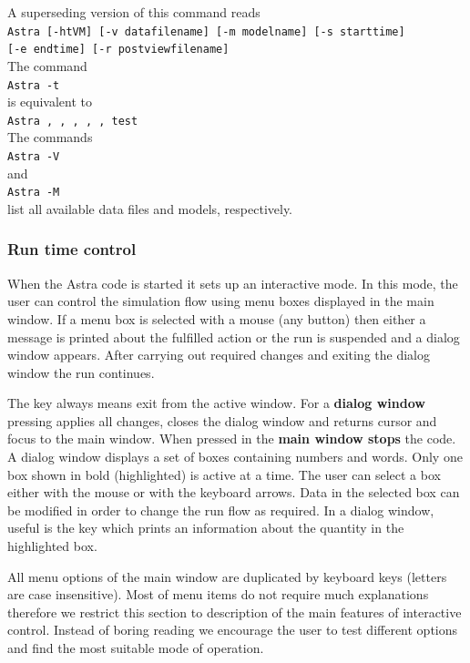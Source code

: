A superseding version of this command reads
\\{\indent
\tt Astra [-htVM] [-v data\us file\us name] [-m model\us name]
[-s start\us time] \\
\hspace*{4.9em}
[-e end\us time] [-r post\us view\us file\us name]
}\\
The command 
\\{\indent
\tt Astra -t
}\\
is equivalent to
\\{\indent
\tt Astra~,~,~,~,~,~test
}\\
The commands
\\{\indent
\tt Astra -V
}\\
and
\\{\indent
\tt Astra -M
}\\
list all available data files and models, respectively.

\subsubsection{Run time control}

When the Astra code is started it sets up an interactive mode.
In this mode, the user can control the simulation flow using menu boxes
displayed in the main window. 
If a menu box is selected with a mouse (any button) then either a
message is printed about the fulfilled action or the run is
suspended and a dialog window appears.
After carrying out required changes and exiting the dialog window the
run continues. 

The key  always means exit from the active window. 
For a {\bf dialog window} pressing  applies all changes,
closes the dialog window and returns cursor and focus to the main window.
When pressed in the {\bf main window  stops} the code.
A dialog window displays a set of boxes containing numbers and words.
Only one box shown in bold (highlighted) is active at a time. 
The user can select a box either with the mouse or with the keyboard
arrows. 
Data in the selected box can be modified in order to change the run flow
as required. 
In a dialog window, useful is the key  which prints
an information about the quantity in the highlighted box. 

All menu options of the main window are duplicated by keyboard keys
(letters are case insensitive). 
Most of menu items do not require much explanations therefore we
restrict this section to description of the main features of interactive
control. 
Instead of boring reading we encourage the user to test different options
and find the most suitable mode of operation. 

